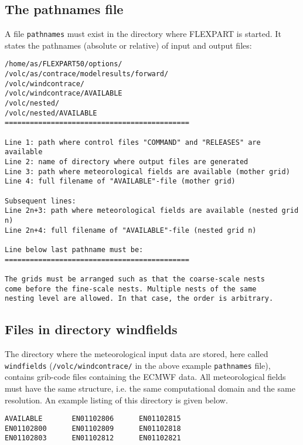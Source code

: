 \documentclass{egu}                  %
\begin{document}
\subsection{The pathnames file}
A file \verb|pathnames| must exist in the directory where FLEXPART is started.
It states the pathnames (absolute or relative) of input and output files:
\begin{footnotesize}\begin{verbatim}
/home/as/FLEXPART50/options/
/volc/as/contrace/modelresults/forward/
/volc/windcontrace/
/volc/windcontrace/AVAILABLE
/volc/nested/
/volc/nested/AVAILABLE
============================================

Line 1: path where control files "COMMAND" and "RELEASES" are available
Line 2: name of directory where output files are generated
Line 3: path where meteorological fields are available (mother grid)
Line 4: full filename of "AVAILABLE"-file (mother grid)

Subsequent lines:
Line 2n+3: path where meteorological fields are available (nested grid n)
Line 2n+4: full filename of "AVAILABLE"-file (nested grid n)

Line below last pathname must be:
============================================

The grids must be arranged such as that the coarse-scale nests
come before the fine-scale nests. Multiple nests of the same
nesting level are allowed. In that case, the order is arbitrary.
\end{verbatim}\end{footnotesize}

\newpage

\subsection{Files in directory windfields}

The directory where the meteorological input data are stored, here called
\verb|windfields| (\verb|/volc/windcontrace/| in the above example
\verb|pathnames| file), contains grib-code files containing the ECMWF data.
All meteorological fields must have the same structure, i.e.  the same
computational domain and the same resolution.  An example listing of this
directory is given below.
\begin{footnotesize}\begin{verbatim}
AVAILABLE       EN01102806      EN01102815
EN01102800      EN01102809      EN01102818
EN01102803      EN01102812      EN01102821
\end{verbatim}\end{footnotesize}
\end{document}

